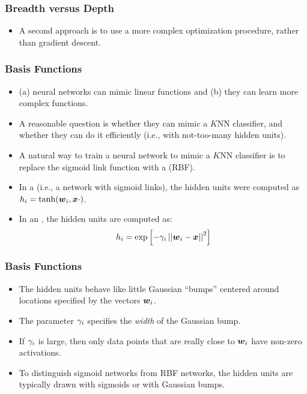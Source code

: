 \documentclass[trans]{beamer}
\begin{document}
\begin{frame}
  \frametitle{Breadth versus Depth}
\begin{itemize}
\item
A second
approach is to use a more complex optimization procedure, rather than
gradient descent.  
\end{itemize}
\end{frame}


\begin{frame}
  \frametitle{Basis Functions}
\begin{itemize}
\item
 (a) neural networks can mimic linear
functions and (b) they can learn more complex functions.  
\item A reasonable
question is whether they can mimic a $K$NN classifier, and whether
they can do it efficiently (i.e., with not-too-many hidden units).
\item 
A natural way to train a neural network to mimic a $K$NN classifier is
to replace the sigmoid link function with a  (RBF).
\item  In a  (i.e., a network
with sigmoid links), the hidden units were computed as $h_i =
\tanh({\boldsymbol{w}}_i,{\boldsymbol{x}} \cdot )$.
\item  In an , the hidden
units are computed as:
%
\begin{equation}
h_i = \exp\left[ - \gamma_i \left\vert\left\vert {\boldsymbol{w}}_i - {\boldsymbol{x}} \right\vert\right\vert^2 \right]
\end{equation}
%
%
\end{itemize}
\end{frame}

\begin{frame}
  \frametitle{Basis Functions}
\begin{itemize}
\item
The hidden units behave like little Gaussian ``bumps''
centered around locations specified by the vectors ${\boldsymbol{w}}_i$.  
\item The parameter $\gamma_i$ specifies the \emph{width} of the Gaussian bump.
\item If $\gamma_i$ is large, then only data points that are really close to
${\boldsymbol{w}}_i$ have non-zero activations.  
\item To distinguish sigmoid networks
from RBF networks, the hidden units are typically drawn with sigmoids
or with Gaussian bumps.
\end{itemize}
\end{frame}
\end{document}
